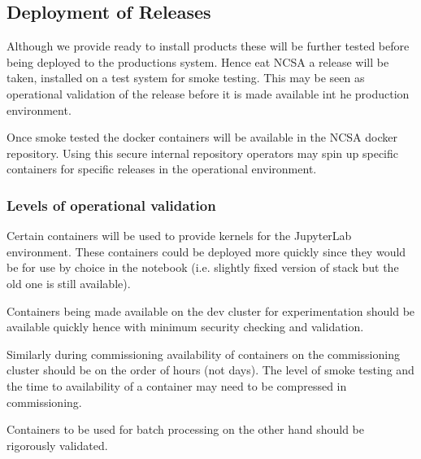 \subsection{Deployment of Releases}\label{sect:reldep}
Although we provide ready to install products these will be further tested before being deployed to the productions system. Hence eat NCSA a release will be taken, installed on a test system for smoke testing. This may be seen as operational validation of the release before it is made available int he production environment.

Once smoke tested the docker containers will be available in the NCSA docker repository. Using this secure internal repository operators may spin up specific containers for specific releases in the operational environment.

\subsubsection{Levels of operational validation}
Certain containers will be used to provide kernels for the JupyterLab environment. These containers could be
deployed more quickly since they would be for use by choice in the notebook (i.e. slightly fixed version of stack but the old one is still available).

Containers being made available on the dev cluster for experimentation should be available quickly hence with minimum security checking and validation.

Similarly during commissioning  availability of containers on the commissioning cluster should be on the order of hours (not days). The level of smoke testing and the time to availability of a container may need to be compressed in commissioning.

Containers to be used for batch processing on the other hand should be rigorously validated.


